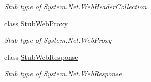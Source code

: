 \begin{DoxyCompactItemize}
\begin{DoxyCompactList}\small\item\em Stub type of System.\-Net.\-Web\-Header\-Collection\end{DoxyCompactList}\item 
class \hyperlink{class_system_1_1_net_1_1_fakes_1_1_stub_web_proxy}{Stub\-Web\-Proxy}
\begin{DoxyCompactList}\small\item\em Stub type of System.\-Net.\-Web\-Proxy\end{DoxyCompactList}\item 
class \hyperlink{class_system_1_1_net_1_1_fakes_1_1_stub_web_response}{Stub\-Web\-Response}
\begin{DoxyCompactList}\small\item\em Stub type of System.\-Net.\-Web\-Response\end{DoxyCompactList}\end{DoxyCompactItemize}
